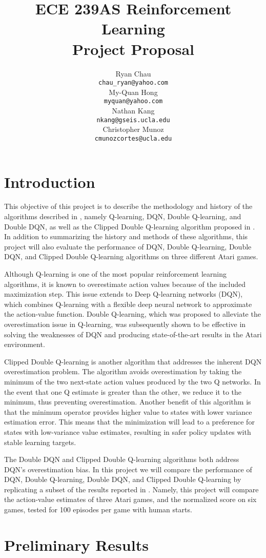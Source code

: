 \documentclass{article}
\title{ECE 239AS Reinforcement Learning\\
       Project Proposal}
\author{%
    Ryan Chau \\
    \texttt{chau\_ryan@yahoo.com}\\
    \And
    My-Quan Hong \\
    \texttt{myquan@yahoo.com} \\
    \And
    Nathan Kang \\
    \texttt{nkang@gseis.ucla.edu} \\
    \And
    Christopher Munoz \\
    \texttt{cmunozcortes@ucla.edu} \\
}
\begin{document}
\maketitle

\section{Introduction}
This objective of this project is to describe the methodology and
history of the algorithms described in \citet{van2016deep}, namely Q-learning,
DQN, Double Q-learning, and Double DQN, as well as the Clipped Double Q-learning
algorithm proposed in \citet{fujimoto2018addressing}. In addition to summarizing
the history and methods of these algorithms, this project will also evaluate the
performance of DQN, Double Q-learning, Double DQN, and Clipped Double Q-learning
algorithms on three different Atari games.

Although Q-learning is one of the most popular reinforcement learning algorithms, it is known
to overestimate action values because of the included maximization step. This
issue extends to Deep Q-learning networks (DQN), which combines Q-learning with a
flexible deep neural network to approximate the action-value function. Double
Q-learning, which was proposed to alleviate the overestimation issue in
Q-learning, was subsequently shown to be effective in solving the weaknesses of
DQN and producing state-of-the-art results in the Atari environment.

Clipped Double Q-learning is another algorithm that addresses the inherent DQN 
overestimation problem. The algorithm avoids overestimation by taking the minimum of the two next-state
action values produced by the two Q networks. In the event that one Q estimate is 
greater than the other, we reduce it to the minimum, thus preventing
overestimation. Another benefit of this algorithm is that the minimum operator
provides higher value to states with lower variance estimation error.  This
means that the minimization will lead to a preference for states with
low-variance value estimates, resulting in safer policy updates with stable
learning targets.

The Double DQN and Clipped Double Q-learning algorithms both address DQN's
overestimation bias. In this project we will compare the performance of DQN, 
Double Q-learning, Double DQN, and Clipped Double Q-learning by replicating 
a subset of the results reported in \cite{van2016deep}. Namely, this project 
will compare the action-value estimates of three Atari games, and the 
normalized score on six games, tested for 100 episodes per game
with human starts. 




\section{Preliminary Results}


\end{document}
